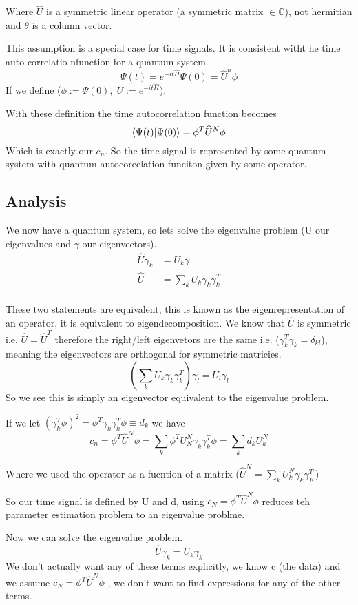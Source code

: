 \documentclass{article}
\newcommand{\be}{\begin{equation}}
\newcommand{\ee}{\end{equation}}
\begin{document}
Where $\widehat{U}$ is a symmetric linear operator (a symmetric matrix $\in \mathbb{C}$), not hermitian and $\theta$ is a column vector.

This assumption is a special case for time signals.
It is consistent witht he time auto correlatio nfunction for a quantum system.
\be
\Psi(t) = e^{-it\widehat{H}} \Psi(0) = \widehat{U}^n\phi
\ee
If we define ($\phi:= \Psi(0), \; U:= e^{-it\widehat{H}}$).

With these definition the time autocorrelation function becomes
\be
\braket{\Psi(t)|\Psi(0)} = \phi^T\widehat{U}^N\phi
\ee
Which is exactly our $c_n$.
So the time signal is represented by some quantum system with quantum autocoreelation funciton given by some operator.

\subsection{Analysis}
We now have a quantum system, so lets solve the eigenvalue problem (U our eigenvalues and $\gamma$ our eigenvectors).
\be
\begin{split}
    \widehat{U}\gamma_k&=U_k\gamma\\
    \widehat{U}&=\sum_kU_k\gamma_k\gamma_k^T\\
\end{split}
\ee

These two statements are equivalent, this is known as the eigenrepresentation of an operator, it is equivalent to eigendecomposition.
We know that $\widehat{U}$ is symmetric i.e. $\widehat{U}=\widehat{U}^T$ therefore the right/left eigenvetors are the same i.e. ($\gamma_k^T\gamma_k=\delta_{kl}$), meaning the eigenvectors are orthogonal for symmetric matricies.
\be
\left( \sum_k U_k\gamma_k\gamma_k^T \right) \gamma_l = U_l\gamma_l
\ee
So we see this is simply an eigenvector equivalent to the eigenvalue problem.

If we let $(\gamma_k^T\phi)^2 = \phi^T\gamma_k \gamma_k^T\phi \equiv d_k$ we have
\be
c_n = \phi^T\widehat{U}^N\phi = \sum_k \phi^T U_N^N \gamma_k\gamma_k^T\phi = \sum_k d_kU_k^N
\ee

Where we used the operator as a fucntion of a matrix ($\widehat{U}^N = \sum_k U_k^N\gamma_k\gamma_K^T$)

So our time signal is defined by U and d, using $c_N=\phi^T\widehat{U}^N\phi$ reduces teh parameter estimation problem to an eigenvalue problme.

Now we can solve the eigenvalue problem.
\be
\widehat{U}\gamma_k = U_k\gamma_k
\ee
We don't actually want any of these terms explicitly, we know c (the data) and we assume $c_N=\phi^T\widehat{U}^N\phi$ , we don't want to find expressions for any of the other terms.
\end{document}
